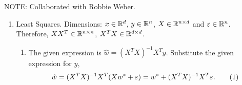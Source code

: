 \documentclass[11pt]{article}
\numberwithin{equation}{enumi}
\begin{document}
\vspace{-20mm}

\setlength{\fboxrule}{.5mm}\setlength{\fboxsep}{1.2mm}
\newlength{\boxlength}\setlength{\boxlength}{\textwidth}
\addtolength{\boxlength}{-4mm}
\begin{center}\end{center}
\vspace{1mm}
NOTE: Collaborated with Robbie Weber. 
\begin{enumerate}
	\item Least Squares. Dimensions: $x \in \mathbb{R}^d$, $y \in \mathbb{R}^n$, $X \in \mathbb{R}^{n \times d}$ and $\varepsilon \in \mathbb{R}^n$. Therefore, $X X^T \in \mathbb{R}^{n \times n}$, $X^T X \in \mathbb{R}^{d \times d}$. 
	\begin{enumerate}
		\item The given expression is $\hat{w} = (X^T X)^{-1} X^T y$. Substitute the given expression for $y$, 
			 \[\hat{w} = (X^T X)^{-1} X^T (X w^* + \varepsilon) = w^* + (X^T X)^{-1} X^T \varepsilon . \numberthis\label{what}\]
		 

\end{enumerate}
\end{enumerate}
\end{document}
